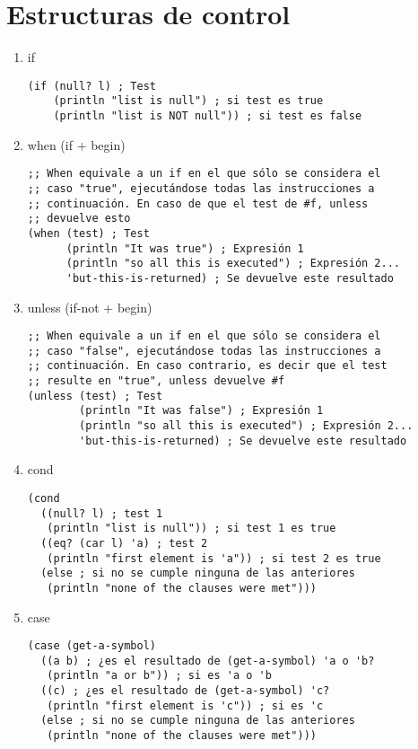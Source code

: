 \documentclass[a4paper,oneside]{article}
\begin{document}
\section{Estructuras de control}
\begin{enumerate}
  \item if

    \begin{verbatim}
(if (null? l) ; Test
    (println "list is null") ; si test es true
    (println "list is NOT null")) ; si test es false
    \end{verbatim}

  \item when (if + begin)

    \begin{verbatim}
;; When equivale a un if en el que sólo se considera el
;; caso "true", ejecutándose todas las instrucciones a
;; continuación. En caso de que el test de #f, unless
;; devuelve esto
(when (test) ; Test
      (println "It was true") ; Expresión 1
      (println "so all this is executed") ; Expresión 2...
      'but-this-is-returned) ; Se devuelve este resultado
    \end{verbatim}

  \item unless (if-not + begin)

    \begin{verbatim}
;; When equivale a un if en el que sólo se considera el
;; caso "false", ejecutándose todas las instrucciones a
;; continuación. En caso contrario, es decir que el test
;; resulte en "true", unless devuelve #f
(unless (test) ; Test
        (println "It was false") ; Expresión 1
        (println "so all this is executed") ; Expresión 2...
        'but-this-is-returned) ; Se devuelve este resultado
    \end{verbatim}

  \item cond

    \begin{verbatim}
(cond
  ((null? l) ; test 1
   (println "list is null")) ; si test 1 es true
  ((eq? (car l) 'a) ; test 2
   (println "first element is 'a")) ; si test 2 es true
  (else ; si no se cumple ninguna de las anteriores
   (println "none of the clauses were met")))
    \end{verbatim}

  \item case

    \begin{verbatim}
(case (get-a-symbol)
  ((a b) ; ¿es el resultado de (get-a-symbol) 'a o 'b?
   (println "a or b")) ; si es 'a o 'b
  ((c) ; ¿es el resultado de (get-a-symbol) 'c?
   (println "first element is 'c")) ; si es 'c
  (else ; si no se cumple ninguna de las anteriores
   (println "none of the clauses were met")))
    \end{verbatim}

\end{enumerate}
\end{document}
